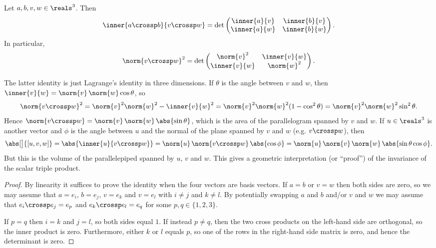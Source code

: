 \documentclass[article, a4paper, 11pt, oneside]{memoir}
\numberwithin{equation}{chapter}
\begin{document}
\begin{proposition}
    Let $a,b,v,w \in \reals^3$. Then
    \begin{equation*}
        \inner{a \crossp b}{v \crossp w}
            = \det
            \begin{pmatrix}
                \inner{a}{v} & \inner{b}{v} \\
                \inner{a}{w} & \inner{b}{w}
            \end{pmatrix}.
    \end{equation*}
    In particular,
    \begin{equation*}
        \norm{v \crossp w}^2
            = \det
            \begin{pmatrix}
                \norm{v}^2 & \inner{v}{w} \\
                \inner{v}{w} & \norm{w}^2
            \end{pmatrix}.
    \end{equation*}
\end{proposition}
%
The latter identity is just Lagrange's identity in three dimensions. If $\theta$ is the angle between $v$ and $w$, then $\inner{v}{w} = \norm{v} \, \norm{w} \cos\theta$, so
%
\begin{equation*}
    \norm{v \crossp w}^2
        = \norm{v}^2 \norm{w}^2 - \inner{v}{w}^2
        = \norm{v}^2 \norm{w}^2 (1 - \cos^2 \theta)
        = \norm{v}^2 \norm{w}^2 \sin^2 \theta.
\end{equation*}
%
Hence $\norm{v \crossp w} = \norm{v} \, \norm{w} \, \abs{\sin \theta}$, which is the area of the parallelogram spanned by $v$ and $w$. If $u \in \reals^3$ is another vector and $\phi$ is the angle between $u$ and the normal of the plane spanned by $v$ and $w$ (e.g. $v \crossp w$), then
%
\begin{equation*}
    \abs[\big]{[u,v,w]}
        = \abs{\inner{u}{v \crossp w}}
        = \norm{u} \, \norm{v \crossp w} \, \abs{\cos\phi}
        = \norm{u} \, \norm{v} \, \norm{w} \, \abs{\sin\theta \cos\phi}.
\end{equation*}
%
But this is the volume of the parallelepiped spanned by $u$, $v$ and $w$. This gives a geometric interpretation (or \enquote{proof}) of the invariance of the scalar triple product.

\begin{proof}
    By linearity it suffices to prove the identity when the four vectors are basis vectors. If $a = b$ or $v = w$ then both sides are zero, so we may assume that $a = e_i$, $b = e_j$, $v = e_k$ and $v = e_l$ with $i \neq j$ and $k \neq l$. By potentially swapping $a$ and $b$ and/or $v$ and $w$ we may assume that $e_i \crossp e_j = e_p$ and $e_k \crossp e_l = e_q$ for some $p,q \in \{1,2,3\}$.

    If $p = q$ then $i = k$ and $j = l$, so both sides equal $1$. If instead $p \neq q$, then the two cross products on the left-hand side are orthogonal, so the inner product is zero. Furthermore, either $k$ or $l$ equals $p$, so one of the rows in the right-hand side matrix is zero, and hence the determinant is zero.
\end{proof}
\end{document}
